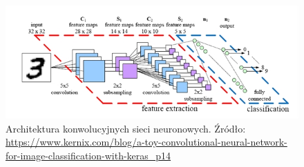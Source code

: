 \begin{figure}[ht!]
\centering
\includegraphics[scale=0.75]{res/cnn3.jpg}
\caption[Caption for LOF]{Architektura konwolucyjnych sieci neuronowych. Źródło: \url{ https://www.kernix.com/blog/a-toy-convolutional-neural-network-for-image-classification-with-keras_p14}\label{cnn3}} 
\end{figure}


